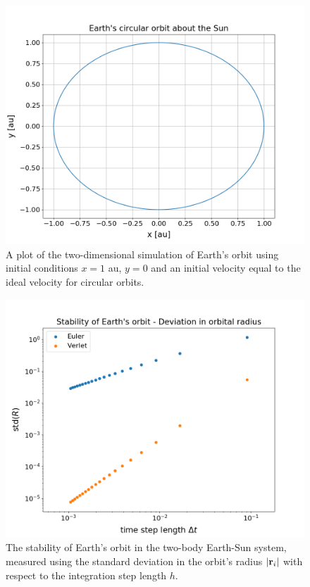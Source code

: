 \documentclass[reprint,english]{revtex4-1}
\begin{document}
\begin{figure}[]
\centering
\includegraphics[scale=0.3]{../output/test_algorithms/Earth_orbit.png}
\caption{A plot of the two-dimensional simulation of Earth's orbit using initial conditions \(x=1\) au, \(y=0\) and an initial velocity equal to the ideal velocity for circular orbits.}\label{fig:Earth_orbit_circular}
\end{figure}

\begin{figure}[]
\centering
\includegraphics[scale=0.3]{../output/test_algorithms/Earth_Stability_radius.png}
\caption{The stability of Earth's orbit in the two-body Earth-Sun system, measured using the standard deviation in the orbit's radius \(|\vb{r}_i|\) with respect to the integration step length \(h\).}\label{fig:Earth_circular_stability_radius}
\end{figure}
\end{document}
